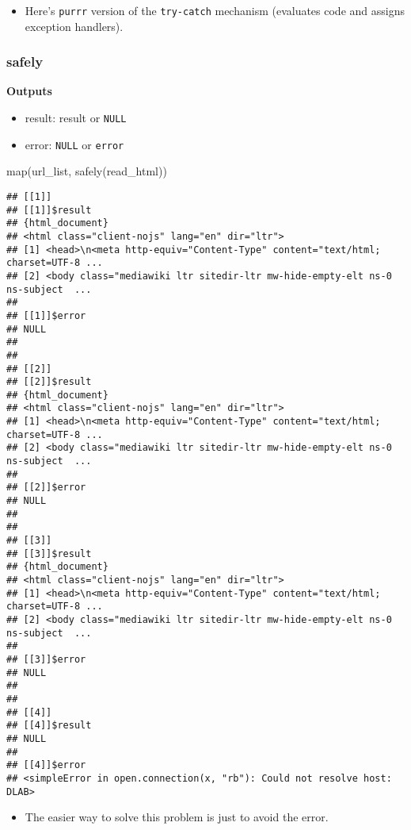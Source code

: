 \documentclass[
]{book}
\newenvironment{Shaded}{\begin{snugshade}}{\end{snugshade}}
\newcommand{\FunctionTok}[1]{\textcolor[rgb]{0.00,0.00,0.00}{#1}}
\newcommand{\NormalTok}[1]{#1}
\providecommand{\tightlist}{%
  \setlength{\itemsep}{0pt}\setlength{\parskip}{0pt}}
\begin{document}
\begin{itemize}
\tightlist
\item
  Here's \texttt{purrr} version of the \texttt{try-catch} mechanism (evaluates code and assigns exception handlers).
\end{itemize}

\hypertarget{safely}{%
\subsubsection{safely}\label{safely}}

\textbf{Outputs}

\begin{itemize}
\tightlist
\item
  result: result or \texttt{NULL}
\item
  error: \texttt{NULL} or \texttt{error}
\end{itemize}

\begin{Shaded}
\begin{Highlighting}[]
\FunctionTok{map}\NormalTok{(url\_list, }\FunctionTok{safely}\NormalTok{(read\_html))}
\end{Highlighting}
\end{Shaded}

\begin{verbatim}
## [[1]]
## [[1]]$result
## {html_document}
## <html class="client-nojs" lang="en" dir="ltr">
## [1] <head>\n<meta http-equiv="Content-Type" content="text/html; charset=UTF-8 ...
## [2] <body class="mediawiki ltr sitedir-ltr mw-hide-empty-elt ns-0 ns-subject  ...
## 
## [[1]]$error
## NULL
## 
## 
## [[2]]
## [[2]]$result
## {html_document}
## <html class="client-nojs" lang="en" dir="ltr">
## [1] <head>\n<meta http-equiv="Content-Type" content="text/html; charset=UTF-8 ...
## [2] <body class="mediawiki ltr sitedir-ltr mw-hide-empty-elt ns-0 ns-subject  ...
## 
## [[2]]$error
## NULL
## 
## 
## [[3]]
## [[3]]$result
## {html_document}
## <html class="client-nojs" lang="en" dir="ltr">
## [1] <head>\n<meta http-equiv="Content-Type" content="text/html; charset=UTF-8 ...
## [2] <body class="mediawiki ltr sitedir-ltr mw-hide-empty-elt ns-0 ns-subject  ...
## 
## [[3]]$error
## NULL
## 
## 
## [[4]]
## [[4]]$result
## NULL
## 
## [[4]]$error
## <simpleError in open.connection(x, "rb"): Could not resolve host: DLAB>
\end{verbatim}

\begin{itemize}
\tightlist
\item
  The easier way to solve this problem is just to avoid the error.
\end{itemize}
\end{document}
